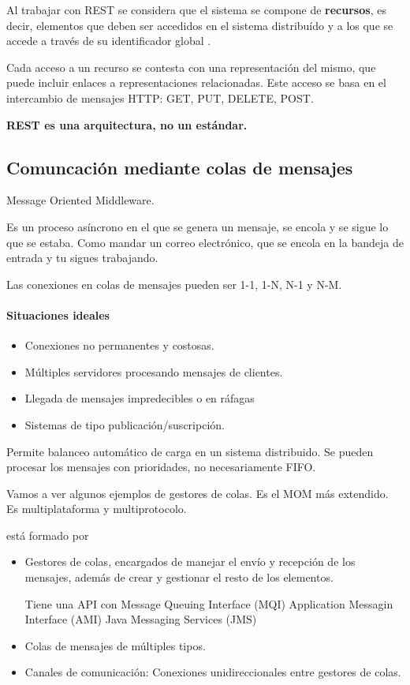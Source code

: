 Al trabajar con REST se considera que el sistema se compone de \textbf{recursos}, es decir, elementos que deben ser accedidos en el sistema distribuído y a los que se accede a través de su identificador global .

Cada acceso a un recurso se contesta con una representación del mismo, que puede incluir enlaces a representaciones relacionadas. Este acceso se basa en el intercambio de mensajes HTTP: GET, PUT, DELETE, POST.

\textbf{REST es una arquitectura, no un estándar.}

\subsection{Comuncación mediante colas de mensajes}

\begin{defn}[MOM]
Message Oriented Middleware.

Es un proceso asíncrono en el que se genera un mensaje, se encola y se sigue lo que se estaba. Como mandar un correo electrónico, que se encola en la bandeja de entrada y tu sigues trabajando.
\end{defn}

Las conexiones en colas de mensajes pueden ser 1-1, 1-N, N-1 y N-M.

\paragraph{Situaciones ideales}
\begin{itemize}
 	\item Conexiones no permanentes y costosas.
 	\item Múltiples servidores procesando mensajes de clientes.
 	\item Llegada de mensajes impredecibles o en ráfagas
 	\item Sistemas de tipo publicación/suscripción.
 \end{itemize}
 \obs Permite balanceo automático de carga en un sistema distribuido. Se pueden procesar los mensajes con prioridades, no necesariamente FIFO.

Vamos a ver algunos ejemplos de gestores de colas.
Es el MOM más extendido. Es multiplataforma y multiprotocolo.


 está formado por
\begin{itemize}
	\item Gestores de colas, encargados de manejar el envío y recepción de los mensajes, además de crear y gestionar el resto de los elementos.

	Tiene una API con
	\subitem Message Queuing Interface (MQI)
	\subitem Application Messagin Interface (AMI)
	\subitem Java Messaging Services (JMS)
	\item Colas de mensajes de múltiples tipos.
	\item Canales de comunicación: Conexiones unidireccionales entre gestores de colas.
\end{itemize}

